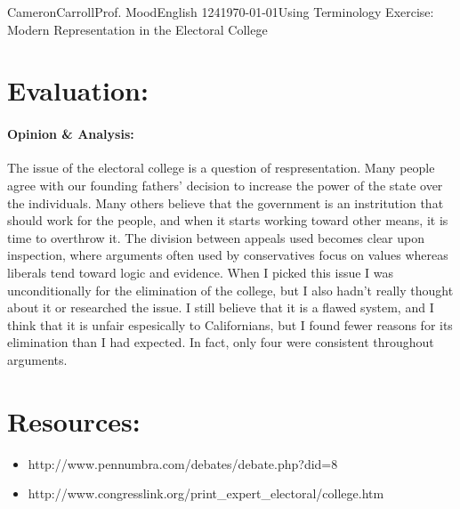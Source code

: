 \documentclass[12pt,letterpaper]{article}
\begin{document}
\begin{mla}{Cameron}{Carroll}{Prof. Mood}{English 124}{\today}{Using Terminology Exercise: Modern Representation in the Electoral College}
\section*{Evaluation:}

\paragraph{Opinion \& Analysis:}
The issue of the electoral college is a question of respresentation. Many people agree with our founding fathers' decision to increase the power of the state over the individuals. Many others believe that the government is an instritution that should work for the people, and when it starts working toward other means, it is time to overthrow it. The division between appeals used becomes clear upon inspection, where arguments often used by conservatives focus on values whereas liberals tend toward logic and evidence. When I picked this issue I was unconditionally for the elimination of the college, but I also hadn't really thought about it or researched the issue. I still believe that it is a flawed system, and I think that it is unfair espesically to Californians, but I found fewer reasons for its elimination than I had expected. In fact, only four were consistent throughout arguments.

\section*{Resources:}

\begin{itemize}
\item http://www.pennumbra.com/debates/debate.php?did=8 \\
\item http://www.congresslink.org/print\_expert\_electoral/college.htm \\
\end{itemize}

\end{mla}
\end{document}
